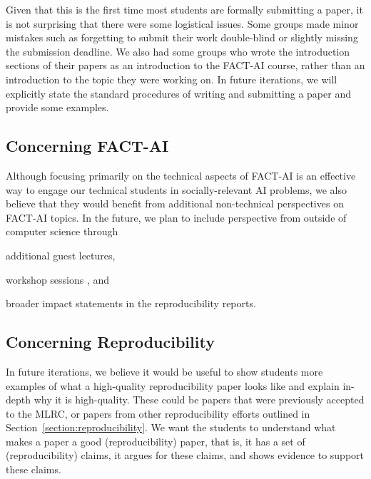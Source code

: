 Given that this is the first time most students are formally submitting a paper, it is not surprising that there were some logistical issues. 
Some groups made minor mistakes such as forgetting to submit their work double-blind or slightly missing the submission deadline. 
We also had some groups who wrote the introduction sections of their papers as an introduction to the FACT-AI course, rather than an introduction to the topic they were working on. 
In future iterations, we will explicitly state the standard procedures of writing and submitting a paper and provide some examples. 

\subsection{Concerning FACT-AI}
\label{section:non-technical}

Although focusing primarily on the technical aspects of FACT-AI is an effective way to engage our technical students in socially-relevant AI problems, we also believe that they would benefit from additional non-technical perspectives on FACT-AI topics. 
In the future, we plan to include perspective from outside of computer science through 
\begin{enumerate*}[label=(\roman*)]
\item additional guest lectures, 
\item workshop sessions \citep{skirpan2018ethics,shenvalue2021}, and 
\item broader impact statements \citep{campbell2021_responsible} in the reproducibility reports. 
\end{enumerate*}

\subsection{Concerning Reproducibility}
In future iterations, we believe it would be useful to show students more examples of what a high-quality reproducibility paper looks like and explain in-depth why it is high-quality. 
These could be papers that were previously accepted to the MLRC, or papers from other reproducibility efforts outlined in Section~\ref{section:reproducibility}. 
We want the students to understand what makes a paper a good (reproducibility) paper, that is, it has a set of (reproducibility) claims, it argues for these claims, and shows evidence to support these claims.  